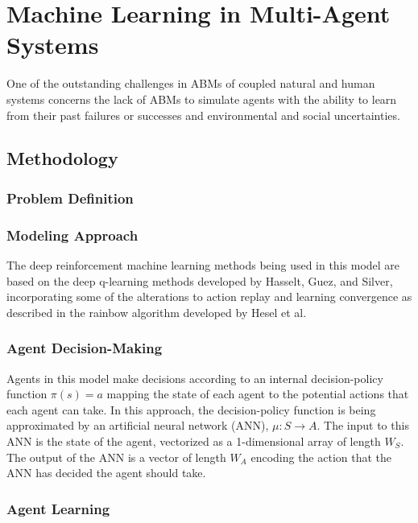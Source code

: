 \chapter{Machine Learning in Multi-Agent Systems}
\label{chap:farm}

One of the outstanding challenges in ABMs of coupled natural and human systems 
concerns the lack of ABMs to simulate agents with the ability to learn from 
their past failures or successes and environmental and social uncertainties.
\cite{sert2020segregation}

\section{Methodology}
\label{sec:farm_methods}

\subsection{Problem Definition}
\label{subsec:farm_methods_problem}

\subsection{Modeling Approach}
\label{subsec:farm_methods_approach}

The deep reinforcement machine learning methods being used in this model are
based on the deep q-learning methods developed by Hasselt, Guez, and
Silver\cite{ddqn16}, incorporating some of the alterations to action replay
and learning convergence as described in the rainbow algorithm developed by
Hesel et al.\cite{rainbow18}

\subsection{Agent Decision-Making}
\label{subsec:farm_methods_decisions}

Agents in this model make decisions according to an internal decision-policy
function $\pi(s)=a$ mapping the state of each agent to the potential actions 
that each agent can take.
In this approach, the decision-policy function is being approximated by
an artificial neural network (ANN), $\mu:S\rightarrow A$.
The input to this ANN is the state of the agent, vectorized as a 1-dimensional
array of length $W_S$.
The output of the ANN is a vector of length $W_A$ encoding the action that
the ANN has decided the agent should take.

\subsection{Agent Learning}
\label{subsec:farm_methods_learning}

